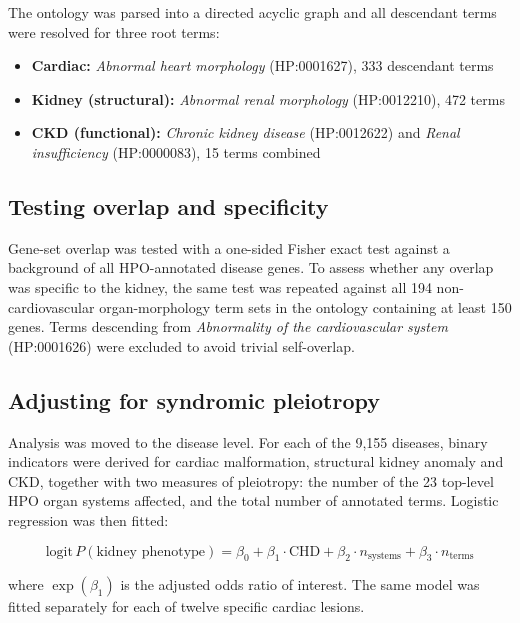 \documentclass[11pt,a4paper]{article}
\begin{document}
The ontology was parsed into a directed acyclic graph and all descendant terms were resolved
for three root terms:

\begin{itemize}[leftmargin=*,itemsep=0.1em]
\item \textbf{Cardiac:} \textit{Abnormal heart morphology} (HP:0001627), 333 descendant terms
\item \textbf{Kidney (structural):} \textit{Abnormal renal morphology} (HP:0012210), 472 terms
\item \textbf{CKD (functional):} \textit{Chronic kidney disease} (HP:0012622) and
      \textit{Renal insufficiency} (HP:0000083), 15 terms combined
\end{itemize}

\subsection{Testing overlap and specificity}

Gene-set overlap was tested with a one-sided Fisher exact test against a background of all
HPO-annotated disease genes. To assess whether any overlap was specific to the kidney, the
same test was repeated against all 194 non-cardiovascular organ-morphology term sets in the
ontology containing at least 150 genes. Terms descending from
\textit{Abnormality of the cardiovascular system} (HP:0001626) were excluded to avoid
trivial self-overlap.

\subsection{Adjusting for syndromic pleiotropy}

Analysis was moved to the disease level. For each of the 9,155 diseases, binary indicators
were derived for cardiac malformation, structural kidney anomaly and CKD, together with two
measures of pleiotropy: the number of the 23 top-level HPO organ systems affected, and the
total number of annotated terms. Logistic regression was then fitted:

\begin{equation}
\mathrm{logit}\,P(\text{kidney phenotype}) = \beta_0 + \beta_1 \cdot \text{CHD}
 + \beta_2 \cdot n_{\text{systems}} + \beta_3 \cdot n_{\text{terms}}
\end{equation}

where $\exp(\beta_1)$ is the adjusted odds ratio of interest. The same model was fitted
separately for each of twelve specific cardiac lesions.
\end{document}
